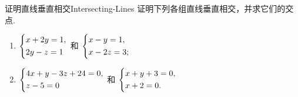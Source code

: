 \begin{problem}{证明直线垂直相交}{Intersecting-Lines}
    证明下列各组直线垂直相交，并求它们的交点.
    \begin{enumerate}
        \item $\begin{dcases} x + 2y = 1, \\ 2y - z = 1 \end{dcases}$ 和 $\begin{dcases} x - y = 1, \\ x - 2z = 3; \end{dcases}$
        \item $\begin{dcases} 4x + y - 3z + 24 = 0, \\ z - 5 = 0 \end{dcases}$ 和 $\begin{dcases} x + y + 3 = 0, \\ x + 2 = 0. \end{dcases}$
    \end{enumerate}
\end{problem}

